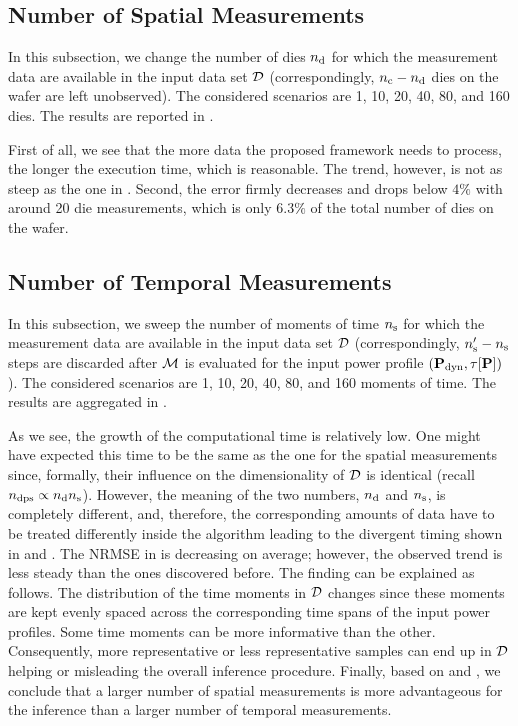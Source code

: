 \subsection{Number of Spatial Measurements}
In this subsection, we change the number of dies ${n_{\text{d}}}$ for which the measurement data are available in the input data set $\mathcal{D}$ (correspondingly, ${n_{\text{c}}} - {n_{\text{d}}}$ dies on the wafer are left unobserved). The considered scenarios are 1, 10, 20, 40, 80, and 160 dies. The results are reported in .


First of all, we see that the more data the proposed framework needs to process, the longer the execution time, which is reasonable. The trend, however, is not as steep as the one in . Second, the error firmly decreases and drops below $4\%$ with around 20 die measurements, which is only $6.3\%$ of the total number of dies on the wafer.

\subsection{Number of Temporal Measurements}
In this subsection, we sweep the number of moments of time ${n_\text{s}}$ for which the measurement data are available in the input data set $\mathcal{D}$ (correspondingly, ${n_\text{s}'} - {n_\text{s}}$ steps are discarded after $\model$ is evaluated for the input power profile $(\mathbf{P}_{\text{dyn}}, \tau[\mathbf{P}])$). The considered scenarios are 1, 10, 20, 40, 80, and 160 moments of time. The results are aggregated in .


As we see, the growth of the computational time is relatively low. One might have expected this time to be the same as the one for the spatial measurements since, formally, their influence on the dimensionality of $\mathcal{D}$ is identical (recall ${n_\text{dps}} \propto {n_{\text{d}}} {n_\text{s}}$). However, the meaning of the two numbers, ${n_{\text{d}}}$ and ${n_\text{s}}$, is completely different, and, therefore, the corresponding amounts of data have to be treated differently inside the algorithm leading to the divergent timing shown in  and . The NRMSE in  is decreasing on average; however, the observed trend is less steady than the ones discovered before. The finding can be explained as follows. The distribution of the time moments in $\mathcal{D}$ changes since these moments are kept evenly spaced across the corresponding time spans of the input power profiles. Some time moments can be more informative than the other. Consequently, more representative or less representative samples can end up in $\mathcal{D}$ helping or misleading the overall inference procedure. Finally, based on  and , we conclude that a larger number of spatial measurements is more advantageous for the inference than a larger number of temporal measurements.

